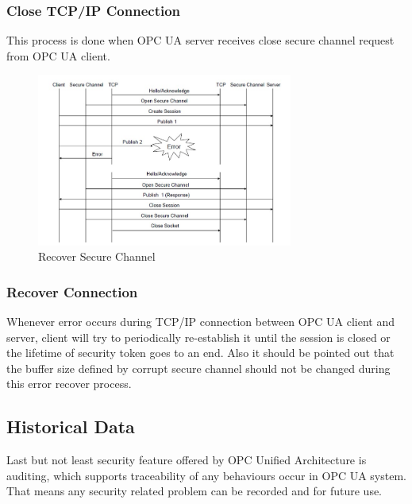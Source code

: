 \documentclass[]{llncs}
\begin{document}
\subsubsection{Close TCP/IP Connection}
This process is done when OPC UA server receives close secure channel request from OPC UA client.
\begin{figure}[ht]
	\centering
	\includegraphics[width=0.75\textwidth]{tcp_3.jpg}
		\caption[ ]{Recover Secure Channel}
	\label{fig:tcp_3}
\end{figure}
\subsubsection{Recover Connection}


Whenever error occurs during TCP/IP connection between OPC UA client and server, client will try to periodically re-establish it until the session is closed or the lifetime of security token goes to an end. Also it should be pointed out that the buffer size defined by corrupt secure channel should not be changed during this error recover process.

\subsection{Historical Data}
Last but not least security feature offered by OPC Unified Architecture is auditing, which supports traceability of any behaviours occur in OPC UA system. That means any security related problem can be recorded and for future use.
\end{document}
